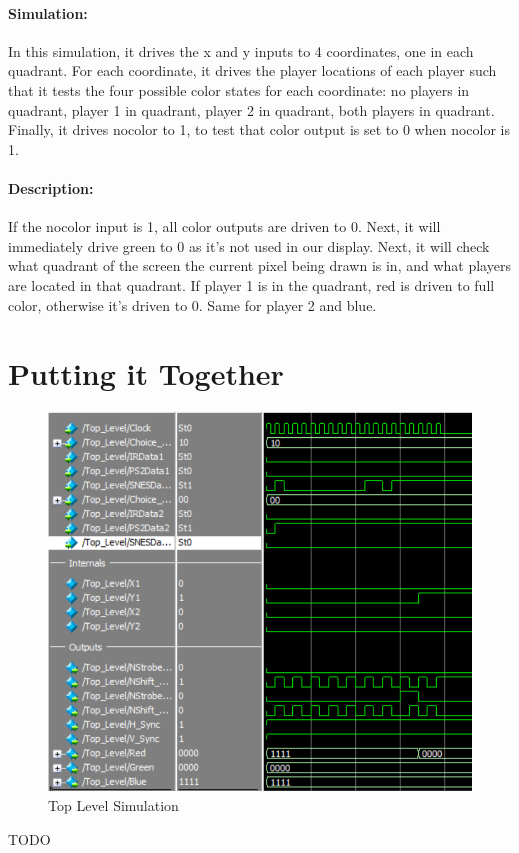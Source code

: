 \documentclass[]{article}
\begin{document}
\paragraph{Simulation:} In this simulation, it drives the x and y inputs to 4 coordinates, one in each quadrant.  For each coordinate, it drives the player locations of each player such that it tests the four possible color states for each coordinate: no players in quadrant, player 1 in quadrant, player 2 in quadrant, both players in quadrant.  Finally, it drives nocolor to 1, to test that color output is set to 0 when nocolor is 1.
\paragraph{Description:} If the nocolor input is 1, all color outputs are driven to 0.  Next, it will immediately drive green to 0 as it's not used in our display.  Next, it will check what quadrant of the screen the current pixel being drawn is in, and what players are located in that quadrant.  If player 1 is in the quadrant, red is driven to full color, otherwise it's driven to 0.  Same for player 2 and blue.

\section{Putting it Together}
\begin{figure}[H]\centering
    \includegraphics[width=\linewidth]{figures/Top_Sim.png}
    \caption{Top Level Simulation}
    \label{fig:topSim}
\end{figure}
TODO
\end{document}
